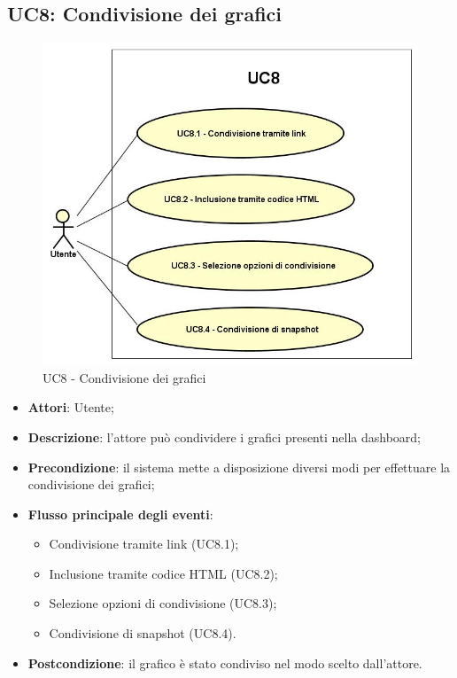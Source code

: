 \subsection{UC8: Condivisione dei grafici}
\hypertarget{UC8}{}
\begin{figure} [H]
	\centering
	\includegraphics[scale=0.45]{Img/UC8}
	\caption{UC8 - Condivisione dei grafici}\label{}
\end{figure}
\begin{itemize}
	\item \textbf{Attori}: Utente;
	\item \textbf{Descrizione}: l'attore può condividere i grafici presenti nella dashboard;
	\item \textbf{Precondizione}: il sistema mette a disposizione diversi modi per effettuare la condivisione dei grafici;
	\item \textbf{Flusso principale degli eventi}:
	\begin{itemize}
		\item Condivisione tramite link (UC8.1);
		\item Inclusione tramite codice HTML (UC8.2);
		\item Selezione opzioni di condivisione (UC8.3);	
		\item Condivisione di snapshot (UC8.4).
	\end{itemize}
	\item \textbf{Postcondizione}: il grafico è stato condiviso nel modo scelto dall'attore.
	
\end{itemize}

